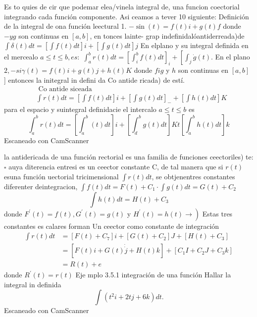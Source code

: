 

Es to quies de cir que podemar elea/vinela integral de, una funcion coectorial integrando cada función componente.
Asi ceamos a tever 10 siguiente:
Definición de la integral de ona función leectural 1. $-\sin (t)=f(t) i+g(t) f$ donde $-y g$ son continuas en $[a, b]$, en tonces lainte- grap indefinidalóantiderreada)de
$\int \delta(t) d t=\left[\int f(t) d t\right] i+\left[\int g(t) d t\right] j$ En elplano y su integral definida en el mercealo $a \leq t \leq b, e s:$
$\int_a^b r(t) d t=\left[\int_i^b f(t) d t\right]_i+\left[\int_j \dot{g}(t)\right.$. En el plano $2,-s i \gamma(t)=f(t) i+g(t) j+h(t) K$ donde $f i g$ y $h$ son continuas en $[a, b]$ ] entonces la initegral in defini da Co antide ricada) de estí.
$$
\begin{aligned}
	& \text { Co antide siceada } \\
	& \int r(t) d t=\left[\int f(t) d t\right] i+\left[\int g(t) d t\right]_{-}+\left[\int h(t) d t\right] K
\end{aligned}
$$
para el espacio
y suintegral definidacie el intercalo $a \leq t \leq b$ es
$$
\int_a^b r(t) d t=\left[\int_a^b(t) d t\right] i+\left[\int_d^b g(t) d t\right] K t\left[\int_a^b h(t) d t\right] k
$$
Escaneado con CamScanner




la antidericada de una función rectorial es una familia de funciones ceectoriles)
te: $\square$
auya diterencia entresi es un ceector constante C, de tal manera que si $r(t)$ esuna función uectorial tricimensional $\int r(t) d t$, se obtjenentres constantes diferenter deintegracion,
$\int f(t) d t=F(t)+C_1 \cdot \int g(t) d t=G(t)+C_2$
$$
\int h(t) d t=H(t)+C_3
$$
donde $F^{\prime}(t)=f(t), G^{\prime}(t)=g(t)$ y $\left.H^{\prime}(t)=h(t) \rightarrow\right)$ Estas tres constantes es calares forman Un ceector como constante de integración
$$
\begin{aligned}
	\int r(t) d t & =\left[F(t)+C_7\right] i+\left[G(t)+C_2\right] J+\left[H(t)+C_3\right] \\
	& =[F(t) i+G(t) \dot{\dot{j}}+H(t) k]+\left[C_1 I+C_2 J+C_3 k\right] \\
	& =R(t)+e
\end{aligned}
$$
donde $R^{\prime}(t)=r(t)$
Eje mplo 3.5.1 integración de una función
Hallar la integral in definida
$$
\int\left(t^2 i+2 t j+6 k\right) d t .
$$
Escaneado con CamScanner




